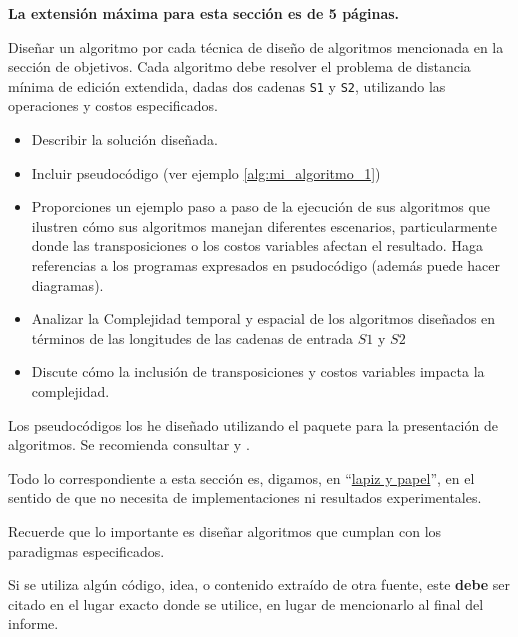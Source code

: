 \begin{mdframed}
    \textbf{La extensión máxima para esta sección es de 5 páginas.}
\end{mdframed}

Diseñar un algoritmo por cada técnica de diseño de algoritmos mencionada en la sección de objetivos. Cada algoritmo debe resolver el problema de distancia mínima de edición extendida, dadas dos cadenas \texttt{S1} y \texttt{S2}, utilizando las operaciones y costos especificados.

\begin{itemize}
    \item Describir la solución diseñada. 
    \item Incluir pseudocódigo (ver ejemplo \cref{alg:mi_algoritmo_1})
    \item Proporciones un ejemplo paso a paso de la ejecución de sus algoritmos que ilustren cómo sus algoritmos manejan diferentes escenarios, particularmente donde las
    transposiciones o los costos variables afectan el
    resultado. Haga referencias a los programas expresados en psudocódigo (además puede hacer diagramas).
    \item Analizar la Complejidad temporal y espacial de los algoritmos diseñados en términos de las longitudes de las cadenas de entrada $S1$ y $S2$
    \item Discute cómo la inclusión de transposiciones y costos   variables impacta la complejidad.
\end{itemize}

Los pseudocódigos los he diseñado utilizando el paquete  \cite{algorithm2e} para la presentación de algoritmos. Se recomienda consultar  \cite{ctan-algorithm2e} y  \cite{overleaf-algorithms}.

Todo lo correspondiente a esta sección es, digamos, en ``\href{https://dle.rae.es/metáfora}{lapiz y papel}'', en el sentido de que no necesita de implementaciones ni resultados experimentales. 

\begin{mdframed}
    Recuerde que lo importante es diseñar algoritmos que cumplan con los paradigmas especificados. 
\end{mdframed}

\begin{mdframed}
    Si se utiliza algún código, idea, o contenido extraído de otra fuente, este \textbf{debe} ser citado en el lugar exacto donde se utilice, en lugar de mencionarlo al final del informe. 
\end{mdframed}